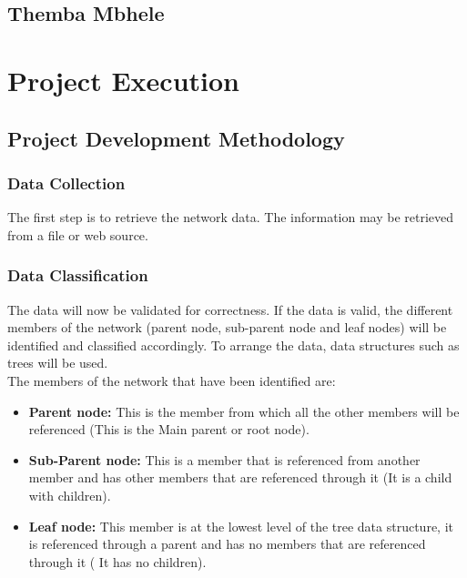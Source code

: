\documentclass{scrartcl}
\begin{document}
\subsection{Themba Mbhele}
\section{Project Execution}
\subsection{Project Development Methodology}
\label{Project Design Methodology}
\subsubsection{Data Collection}
The first step is to retrieve the network data. The information may be retrieved from a file or web source.
\subsubsection{Data Classification}
The data will now be validated for correctness. If the data is valid, the different members of the network (parent node, sub-parent node and leaf nodes)
will be identified and classified accordingly. To arrange the data, data structures such as trees will be used.\\
The members of the network that have been identified are:
\begin{itemize}
	\item \textbf{Parent node:} This is the member from which all the other members will be referenced (This is the Main parent or root node).
	\item \textbf{Sub-Parent node:} This is a member that is referenced from another member and has other members that are referenced through it (It is a child with children).
	\item \textbf{Leaf node:} This member is at the lowest level of the tree data structure, it is referenced through a parent and has no members that are referenced through it ( It has no children).
\end{itemize}
\newpage
\end{document}
